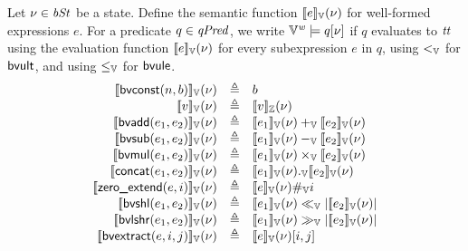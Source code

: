 Let $\nu \in \mathit{bSt}$ be a state.
Define the semantic function $[\![{e}]\!]_{\mathbb{V}}(\nu)$ for well-formed expressions $e$.
For a predicate $q \in \mathit{qPred}$, we write $\mathbb{V}^{\mathit{w}} \models q[\nu]$ if $q$ evaluates to $\mathit{tt}$ using the evaluation function $[\![{e}]\!]_{\mathbb{V}}(\nu)$ for every subexpression $e$ in $q$, using $<_{\mathbb{V}}$ for $\mbox{\textsf{bvult}}$, and using $\leq_{\mathbb{V}}$ for $\mbox{\textsf{bvule}}$.
\[
\begin{array}{rcl}
\bvvalueof{\bvconst(n, b)}(\bvst) & \defn & b \\
\bvvalueof{v}(\bvst) & \defn & \zvalueof{v}(\bvst) \\
\bvvalueof{\bvadd(e_1, e_2)}(\bvst) & \defn & \bvvalueof{e_1}(\bvst) +_\BV \bvvalueof{e_2}(\bvst) \\
\bvvalueof{\bvsub(e_1, e_2)}(\bvst) & \defn & \bvvalueof{e_1}(\bvst) -_\BV \bvvalueof{e_2}(\bvst) \\
\bvvalueof{\bvmul(e_1, e_2)}(\bvst) & \defn & \bvvalueof{e_1}(\bvst) \times_\BV \bvvalueof{e_2}(\bvst) \\
\bvvalueof{\bvconcat(e_1, e_2)}(\bvst) & \defn & \bvvalueof{e_1}(\bvst) ._\BV \bvvalueof{e_2}(\bvst) \\
\bvvalueof{\bvext(e, i)}(\bvst) & \defn & \bvvalueof{e}(\bvst) \#_\BV i \\
\bvvalueof{\bvshl(e_1, e_2)}(\bvst) & \defn & \bvvalueof{e_1}(\bvst) \ll_\BV |\bvvalueof{e_2}(\bvst)| \\
\bvvalueof{\bvlshr(e_1, e_2)}(\bvst) & \defn & \bvvalueof{e_1}(\bvst) \gg_\BV |\bvvalueof{e_2}(\bvst)| \\
\bvvalueof{\bvextract(e, i, j)}(\bvst) & \defn & \bvvalueof{e}(\bvst)[i, j] \\
\end{array}
\]

